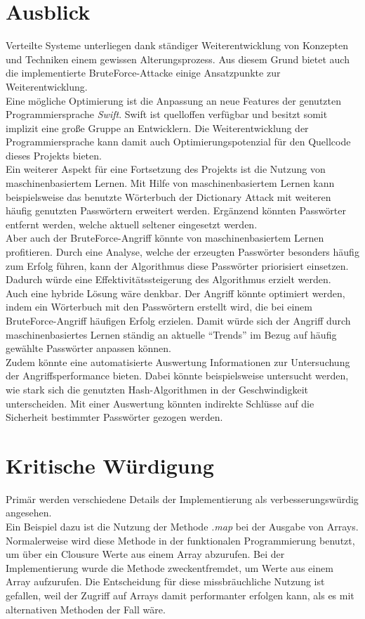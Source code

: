 \section{Ausblick}
\label{ausblick}
Verteilte Systeme unterliegen dank ständiger Weiterentwicklung von Konzepten und Techniken einem gewissen Alterungsprozess. Aus diesem Grund bietet auch die implementierte BruteForce-Attacke einige Ansatzpunkte zur Weiterentwicklung. \\
Eine mögliche Optimierung ist die Anpassung an neue Features der genutzten Programmiersprache \emph{Swift}. Swift ist quelloffen verfügbar und besitzt somit implizit eine große Gruppe an Entwicklern. Die Weiterentwicklung der Programmiersprache kann damit auch Optimierungspotenzial für den Quellcode dieses Projekts bieten. \\
Ein weiterer Aspekt für eine Fortsetzung des Projekts ist die Nutzung von maschinenbasiertem Lernen. Mit Hilfe von maschinenbasiertem Lernen kann beispielsweise das benutzte Wörterbuch der Dictionary Attack mit weiteren häufig genutzten Passwörtern erweitert werden. Ergänzend könnten Passwörter entfernt werden, welche aktuell seltener eingesetzt werden.\\

 Aber auch der BruteForce-Angriff könnte von maschinenbasiertem Lernen profitieren. Durch eine Analyse, welche der erzeugten Passwörter besonders häufig zum Erfolg führen, kann der Algorithmus diese Passwörter priorisiert einsetzen. Dadurch würde eine Effektivitätssteigerung des Algorithmus erzielt werden. \\
 
Auch eine hybride Lösung wäre denkbar. Der Angriff könnte optimiert werden, indem ein Wörterbuch mit den Passwörtern erstellt wird, die bei einem BruteForce-Angriff häufigen Erfolg erzielen. Damit würde sich der Angriff durch maschinenbasiertes Lernen ständig an aktuelle \enquote{Trends} im Bezug auf häufig gewählte Passwörter anpassen können. \\
Zudem könnte eine automatisierte Auswertung Informationen zur Untersuchung der Angriffsperformance bieten. Dabei könnte beispielsweise untersucht werden, wie stark sich die genutzten Hash-Algorithmen in der Geschwindigkeit unterscheiden. Mit einer Auswertung könnten indirekte Schlüsse auf die Sicherheit bestimmter Passwörter gezogen werden. 

\section{Kritische Würdigung}
\label{kritik}
Primär werden verschiedene Details der Implementierung als verbesserungswürdig angesehen. \\
Ein Beispiel dazu ist die Nutzung der Methode \emph{.map} bei der Ausgabe von Arrays. Normalerweise wird diese Methode in der funktionalen Programmierung benutzt, um über ein Clousure Werte aus einem Array abzurufen. Bei der Implementierung wurde die Methode zweckentfremdet, um Werte aus einem Array aufzurufen. Die Entscheidung für diese missbräuchliche Nutzung ist gefallen, weil der Zugriff auf Arrays damit performanter erfolgen kann, als es mit alternativen Methoden der Fall wäre. \\

